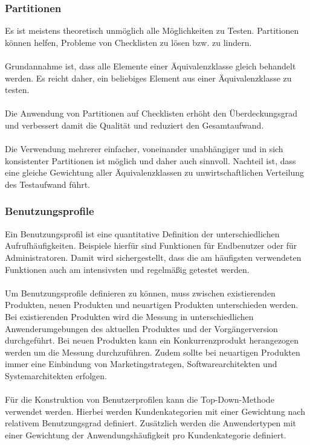 \subsubsection{Partitionen}
Es ist meistens theoretisch unmöglich alle Möglichkeiten zu Testen. Partitionen können helfen, Probleme von Checklisten zu lösen  bzw. zu lindern.
\\\\
Grundannahme ist, dass alle Elemente einer Äquivalenzklasse gleich behandelt werden. Es reicht daher, ein beliebiges Element aus einer Äquivalenzklasse zu testen.
\\\\
Die Anwendung von Partitionen auf Checklisten erhöht den Überdeckungsgrad und verbessert damit die Qualität und reduziert den Gesamtaufwand. 
\\\\
Die Verwendung mehrerer einfacher, voneinander unabhängiger und in sich konsistenter Partitionen ist möglich und daher auch sinnvoll.
Nachteil ist, dass eine gleiche Gewichtung aller Äquivalenzklassen zu unwirtschaftlichen Verteilung des Testaufwand führt.

\subsubsection{Benutzungsprofile}
Ein Benutzungsprofil ist eine quantitative Definition der unterschiedlichen Aufrufhäufigkeiten. Beispiele hierfür sind Funktionen für Endbenutzer oder für Administratoren. Damit wird sichergestellt, dass die am häufigsten verwendeten Funktionen auch am intensivsten und regelmäßig getestet werden. 
\\\\
Um Benutzungsprofile definieren zu können, muss zwischen existierenden Produkten, neuen Produkten und neuartigen Produkten unterschieden werden. Bei existierenden Produkten wird die Messung in unterschiedlichen Anwenderumgebungen des aktuellen Produktes und der Vorgängerversion durchgeführt. Bei neuen Produkten kann ein Konkurrenzprodukt herangezogen werden um die Messung durchzuführen.
Zudem sollte bei neuartigen Produkten immer eine Einbindung von Marketingstrategen, Softwarearchitekten und Systemarchitekten erfolgen. 
\\\\
Für die Konstruktion von Benutzerprofilen kann die Top-Down-Methode verwendet werden. Hierbei werden Kundenkategorien mit einer Gewichtung nach relativem Benutzungsgrad definiert. Zusätzlich werden die Anwendertypen mit einer Gewichtung der Anwendungshäufigkeit pro Kundenkategorie definiert.

